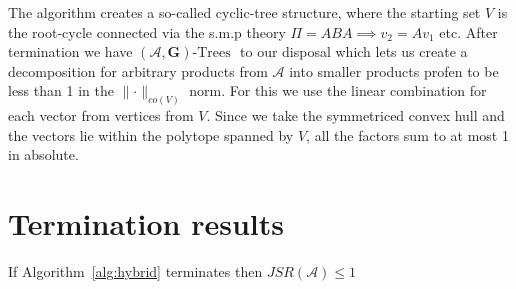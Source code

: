 The algorithm creates a so-called cyclic-tree structure, where the starting set $V$ is the root-cycle connected via the s.m.p theory $\Pi = ABA \implies v_2 = Av_1$ etc.
After termination we have $(\mathcal{A},\mathbf{G})\text{-Trees }$ to our disposal which lets us create a decomposition for arbitrary products from $\mathcal{A}$ into smaller products profen to be less than 1 in the $\lVert \cdot \rVert _ {co(V)}$ norm.
For this we use the linear combination for each vector from vertices from $V$.
Since we take the symmetriced convex hull and the vectors lie within the polytope spanned by $V$, all the factors sum to at most 1 in absolute. 

\section{Termination results}

\begin{theorem}{}\label{thm:hybrid-found}
If Algorithm~\ref{alg:hybrid} terminates then $JSR(\mathcal{A}) \leq 1$
\end{theorem}

